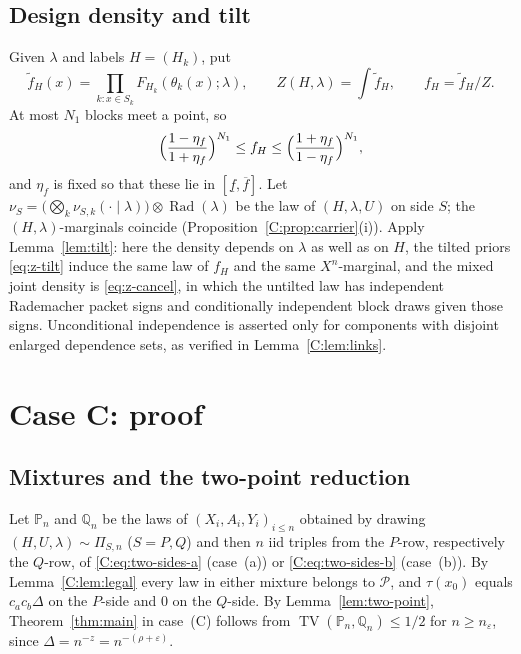 \documentclass[11pt]{article}
\DeclareMathOperator{\Rad}{Rad}
\DeclareMathOperator{\TV}{TV}
\newcommand{\PP}{\mathbb{P}}
\newcommand{\cP}{\mathcal{P}}
\begin{document}
\subsection{Design density and tilt}
Given \(\lambda\) and labels \(H=(H_k)\), put
\begin{equation}
 \widetilde f_H(x)=\prod_{k:x\in S_k}F_{H_k}(\theta_k(x);\lambda),\qquad
 Z(H,\lambda)=\int\widetilde f_H,\qquad f_H=\widetilde f_H/Z .
 \label{C:eq:density}
\end{equation}
At most \(N_1\) blocks meet a point, so
\begin{equation}
 \Bigl(\frac{1-\eta_f}{1+\eta_f}\Bigr)^{N_1}\le f_H\le\Bigl(\frac{1+\eta_f}{1-\eta_f}\Bigr)^{N_1},
 \label{C:eq:density-bounds}
\end{equation}
and \(\eta_f\) is fixed so that these lie in \([\underline f,\overline f]\).
Let \(\nu_S=\bigl(\bigotimes_k\nu_{S,k}(\cdot\mid\lambda)\bigr)\otimes\Rad(\lambda)\)
be the law of \((H,\lambda,U)\) on side \(S\); the \((H,\lambda)\)-marginals
coincide (Proposition~\ref{C:prop:carrier}(i)).  Apply
Lemma~\ref{lem:tilt}: here the density depends on \(\lambda\) as well as on
\(H\), the tilted priors \eqref{eq:z-tilt} induce the same law of \(f_H\)
and the same \(X^n\)-marginal, and the mixed joint density is
\eqref{eq:z-cancel}, in which the untilted law has independent Rademacher packet signs
and conditionally independent block draws given those signs.
Unconditional independence is asserted only for components with
disjoint enlarged dependence sets, as verified in
Lemma~\ref{C:lem:links}.

\section{Case C: proof}\label{C:sec:proof}

\subsection{Mixtures and the two-point reduction}
Let \(\PP_n\) and \(\mathbb Q_n\) be the laws of \((X_i,A_i,Y_i)_{i\le n}\)
obtained by drawing \((H,U,\lambda)\sim\Pi_{S,n}\) (\(S=P,Q\)) and then
\(n\) iid triples from the \(P\)-row, respectively the \(Q\)-row, of
\eqref{C:eq:two-sides-a} (case~(a)) or \eqref{C:eq:two-sides-b} (case~(b)).
By Lemma~\ref{C:lem:legal} every law in either mixture belongs to \(\cP\),
and \(\tau(x_0)\) equals \(c_ac_b\Delta\) on the \(P\)-side and \(0\) on
the \(Q\)-side.  By Lemma~\ref{lem:two-point}, Theorem~\ref{thm:main}
in case~(C) follows from \(\TV(\PP_n,\mathbb Q_n)\le1/2\) for
\(n\ge n_\varepsilon\), since \(\Delta=n^{-z}=n^{-(\rho+\varepsilon)}\).
\end{document}
